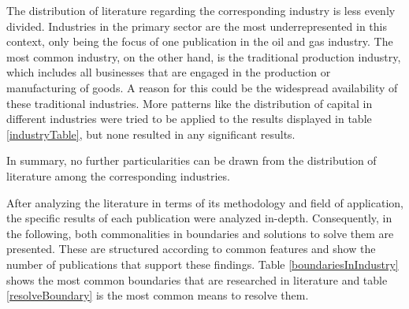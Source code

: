 

The distribution of literature regarding the corresponding industry is less evenly divided. Industries in the primary sector are the most underrepresented in this context, only being the focus of one publication in the oil and gas industry. The most common industry, on the other hand, is the traditional production industry, which includes all businesses that are engaged in the production or manufacturing of goods. A reason for this could be the widespread availability of these traditional industries. More patterns like the distribution of capital in different industries were tried to be applied to the results displayed in table \ref{industryTable}, but none resulted in any significant results. 

In summary, no further particularities can be drawn from the distribution of literature among the corresponding industries.



After analyzing the literature in terms of its methodology and field of application, the specific results of each publication were analyzed in-depth. Consequently, in the following, both commonalities in boundaries and solutions to solve them are presented. These are structured according to common features and show the number of publications that support these findings. Table \ref{boundariesInIndustry} shows the most common boundaries that are researched in literature and table \ref{resolveBoundary} is the most common means to resolve them.

